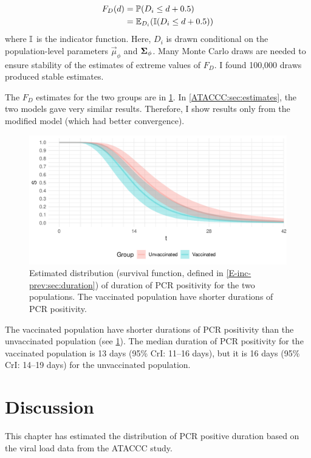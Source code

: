 \documentclass[thesis.tex]{subfiles}
\begin{document}
\begin{align}
  F_D(d)
  &= \operatorname{\mathbb{P}}(D_i \leq d + 0.5) \\
  &= \operatorname{\mathbb{E}}_{D_i}(\operatorname{\mathbb{I}}(D_i \leq d + 0.5)) 
\end{align}
where $\operatorname{\mathbb{I}}$ is the indicator function.
Here, $D_i$ is drawn conditional on the population-level parameters $\vec{\mu}_\phi$ and $\bm{\Sigma}_\phi$.
Many Monte Carlo draws are needed to ensure stability of the estimates of extreme values of $F_D$.
I found 100,000 draws produced stable estimates.

The $F_D$ estimates for the two groups are in \cref{ATACCC:fig:duration}.
In \cref{ATACCC:sec:estimates}, the two models gave very similar results.
Therefore, I show results only from the modified model (which had better convergence).
\begin{figure}
  \centering \includegraphics{ATACCC/duration}
  \caption[Duration of PCR positivity.]{Estimated distribution (survival function, defined in \cref{E-inc-prev:sec:duration}) of duration of PCR positivity for the two populations. The vaccinated population have shorter durations of PCR positivity.  \label{ATACCC:fig:duration}}
\end{figure}

The vaccinated population have shorter durations of PCR positivity than the unvaccinated population (see \cref{ATACCC:fig:duration}).
The median duration of PCR positivity for the vaccinated population is 13 days (95\% CrI: 11--16 days), but it is 16 days (95\% CrI: 14--19 days) for the unvaccinated population.

\section{Discussion}

This chapter has estimated the distribution of PCR positive duration based on the viral load data from the ATACCC study.
\end{document}
